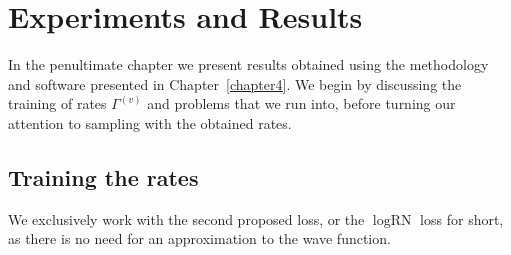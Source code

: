 \ifpdf
\graphicspath{{Chapter5/Figs/Raster/}{Chapter5/Figs/PDF/}{Chapter5/Figs/}}
\else
\graphicspath{{Chapter5/Figs/Vector/}{Chapter5/Figs/}}
\fi


\chapter{Experiments and Results}
\label{chapter5}
In the penultimate chapter we present results obtained using the methodology and software presented in Chapter~\ref{chapter4}. We begin by discussing the training of rates $\Gamma^{(v)}$ and problems that we run into, before turning our attention to sampling with the obtained rates.  

\section{Training the rates}
\label{sec:training_exp}
We exclusively work with the second proposed loss, or the $\log \text{RN}$ loss for short, as there is no need for an approximation to the wave function.

